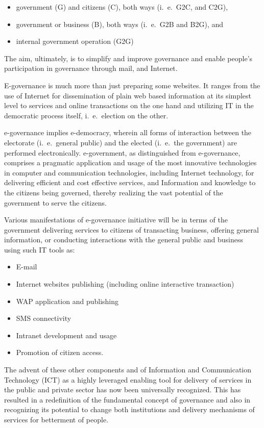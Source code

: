 \begin{itemize}
	\item government (G) and citizens (C), both ways (i.\ e.\ G2C, and C2G),
	\item government or business (B), both ways (i.\ e.\ G2B and B2G), and
	\item internal government operation (G2G)
\end{itemize}

The aim, ultimately, is to simplify and improve governance and enable people's participation in
governance through mail, and Internet.

E-governance is much more than just preparing some websites. It ranges from the use of
Internet for dissemination of plain web based information at its simplest level to services and
online transactions on the one hand and utilizing IT in the democratic process itself, i.\ e.\
election on the other.

e-governance implies e-democracy, wherein all forms of interaction between the electorate
(i.\ e.\ general public) and the elected (i.\ e.\ the government) are performed electronically. e-government, as distinguished from e-governance, comprises a pragmatic application and
usage of the most innovative technologies in computer and communication technologies,
including Internet technology, for delivering efficient and cost effective services, and
Information and knowledge to the citizens being governed, thereby realizing the vast potential
of the government to serve the citizens.

Various manifestations of e-governance initiative will be in terms of the government delivering
services to citizens of transacting business, offering general information, or conducting
interactions with the general public and business using such IT tools as:
\begin{itemize}
	\item E-mail
	\item Internet websites publishing (including online interactive transaction)
	\item WAP application and publishing
	\item SMS connectivity
	\item Intranet development and usage
	\item Promotion of citizen access.
\end{itemize}

The advent of these other components and of Information and Communication Technology
(ICT) as a highly leveraged enabling tool for delivery of services in the public and private sector has now been universally recognized. This has resulted in a redefinition of the fundamental concept of governance and also in recognizing its potential to change both institutions and delivery mechanisms of services for betterment of people.

